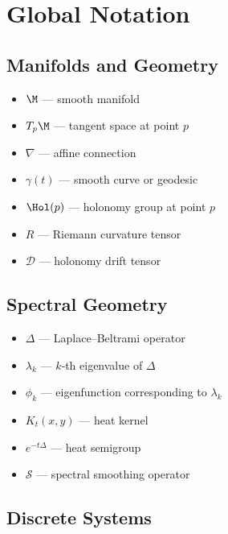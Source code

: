 
\section{Global Notation}

\subsection{Manifolds and Geometry}

\begin{itemize}[leftmargin=2em]
    \item $\M$ — smooth manifold
    \item $T_p\M$ — tangent space at point $p$
    \item $\nabla$ — affine connection
    \item $\gamma(t)$ — smooth curve or geodesic
    \item $\Hol(p)$ — holonomy group at point $p$
    \item $R$ — Riemann curvature tensor
    \item $\mathcal{D}$ — holonomy drift tensor
\end{itemize}

\subsection{Spectral Geometry}

\begin{itemize}[leftmargin=2em]
    \item $\Delta$ — Laplace--Beltrami operator
    \item $\lambda_k$ — $k$‑th eigenvalue of $\Delta$
    \item $\phi_k$ — eigenfunction corresponding to $\lambda_k$
    \item $K_t(x,y)$ — heat kernel
    \item $e^{-t\Delta}$ — heat semigroup
    \item $\mathcal{S}$ — spectral smoothing operator
\end{itemize}

\subsection{Discrete Systems}


